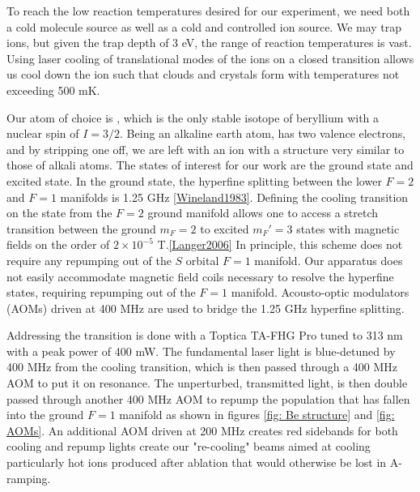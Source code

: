 To reach the low reaction temperatures desired for our experiment, we need both a cold molecule source as well as a cold and controlled ion source. We may trap  ions, but given the trap depth of 3 eV, the range of reaction temperatures is vast. Using laser cooling of translational modes of the ions on a closed transition allows us cool down the ion such that clouds and crystals form with temperatures not exceeding 500 mK.\cite{Wineland1979}

Our atom of choice is , which is the only stable isotope of beryllium with a nuclear spin of $I=3/2$. Being an alkaline earth atom,  has two valence electrons, and by stripping one off, we are left with an ion with a structure very similar to those of alkali atoms. The states of interest for our work are the  ground state and  excited state. In the ground state, the hyperfine splitting between the lower $F=2$ and $F=1$ manifolds is 1.25 GHz \ref{Wineland1983}. Defining the cooling transition on the  state from the $F=2$ ground manifold allows one to access a stretch transition between the ground $m_F=2$ to excited $m_F'=3$ states with magnetic fields on the order of $2 \times 10^{-5}$ T.\ref{Langer2006} In principle, this scheme does not require any repumping out of the $S$ orbital $F=1$ manifold. Our apparatus does not easily accommodate magnetic field coils necessary to resolve the hyperfine states, requiring repumping out of the $F=1$ manifold. Acousto-optic modulators (AOMs) driven at 400 MHz are used to bridge the 1.25 GHz hyperfine splitting.

Addressing the  transition is done with a Toptica TA-FHG Pro tuned to 313 nm with a peak power of 400 mW. The fundamental laser light is blue-detuned by 400 MHz from the cooling transition, which is then passed through a 400 MHz AOM to put it on resonance. The unperturbed, transmitted light, is then double passed through another 400 MHz AOM to repump the population that has fallen into the ground $F=1$ manifold as shown in figures \ref{fig: Be structure} and \ref{fig: AOMs}. An additional AOM driven at 200 MHz creates red sidebands for both cooling and repump lights create our "re-cooling" beams aimed at cooling particularly hot  ions produced after ablation that would otherwise be lost in A-ramping.

